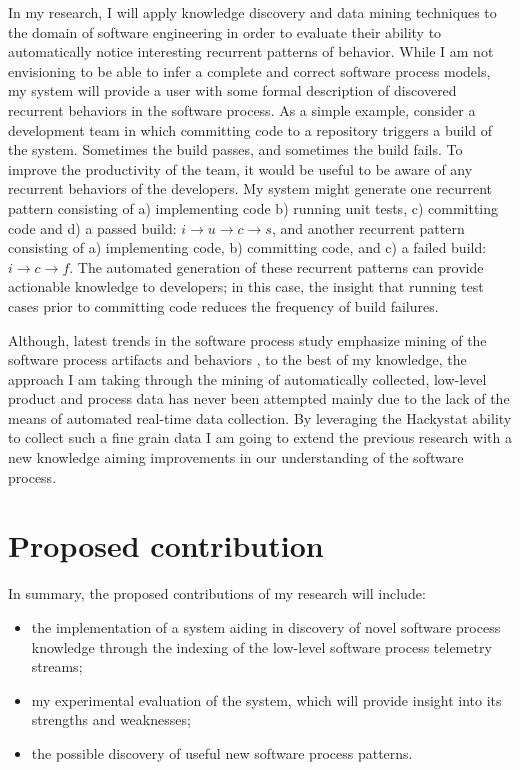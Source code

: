 In my research, I will apply knowledge discovery and data mining techniques to the domain of software engineering in order to evaluate their ability to automatically notice interesting recurrent patterns of behavior. While I am not envisioning to be able to infer a complete and correct software process models, my system will provide a user with some formal description of discovered recurrent behaviors in the software process. As a simple example, consider a development team in which committing code to a repository triggers a build of the system. Sometimes the build passes, and sometimes the build fails. To improve the productivity of the team, it would be useful to be aware of any recurrent behaviors of the developers. My system might generate one recurrent pattern consisting of a) implementing code b) running unit tests, c) committing code and d) a passed build: $i \rightarrow u \rightarrow c \rightarrow s $, and another recurrent pattern consisting of a) implementing code, b) committing code, and c) a failed build: $i \rightarrow c \rightarrow f $. The automated generation of these recurrent patterns can provide actionable knowledge to developers; in this case, the insight that running test cases prior to committing code reduces the frequency of build failures.

Although, latest trends in the software process study emphasize mining of the software process artifacts and behaviors \cite{citeulike:5043664} \cite{citeulike:1885717} \cite{citeulike:5112229} \cite{citeulike:1885717}, to the best of my knowledge, the approach I am taking through the mining of automatically collected, low-level product and process data has never been attempted mainly due to the lack of the means of automated real-time data collection. By leveraging the Hackystat ability to collect such a fine grain data I am going to extend the previous research with a new knowledge aiming improvements in our understanding of the software process.

\section{Proposed contribution}
In summary, the proposed contributions of my research will include: 
\begin{itemize}
	\item the implementation of a system aiding in discovery of novel software process knowledge through the indexing of the low-level software process telemetry streams;
	\item my experimental evaluation of the system, which will provide insight into its strengths and weaknesses;
	\item the possible discovery of useful new software process patterns.
\end{itemize}


